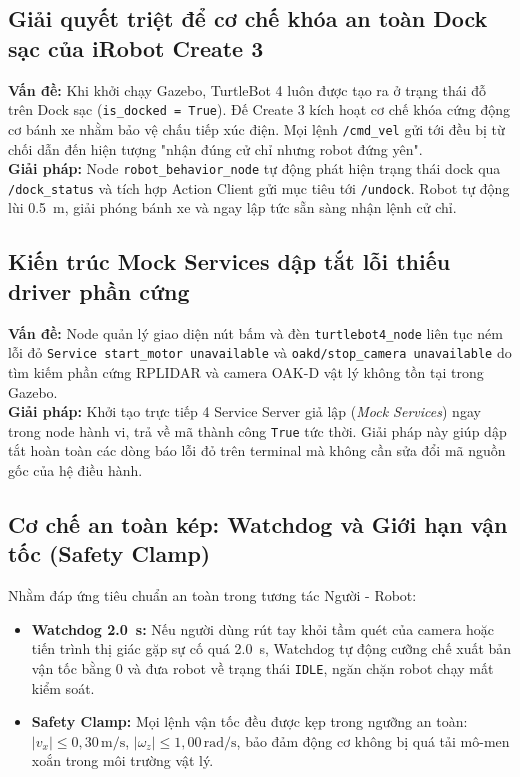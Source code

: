 \subsection{Giải quyết triệt để cơ chế khóa an toàn Dock sạc của iRobot Create 3}
\textbf{Vấn đề:} Khi khởi chạy Gazebo, TurtleBot 4 luôn được tạo ra ở trạng thái đỗ trên Dock sạc (\texttt{is\_docked = True}). Đế Create 3 kích hoạt cơ chế khóa cứng động cơ bánh xe nhằm bảo vệ chấu tiếp xúc điện. Mọi lệnh \texttt{/cmd_vel} gửi tới đều bị từ chối dẫn đến hiện tượng "nhận đúng cử chỉ nhưng robot đứng yên".\\
\textbf{Giải pháp:} Node \texttt{robot\_behavior\_node} tự động phát hiện trạng thái dock qua \texttt{/dock_status} và tích hợp Action Client gửi mục tiêu tới \texttt{/undock}. Robot tự động lùi \SI{0.5}{\meter}, giải phóng bánh xe và ngay lập tức sẵn sàng nhận lệnh cử chỉ.

\subsection{Kiến trúc Mock Services dập tắt lỗi thiếu driver phần cứng}
\textbf{Vấn đề:} Node quản lý giao diện nút bấm và đèn \texttt{turtlebot4\_node} liên tục ném lỗi đỏ \texttt{Service start\_motor unavailable} và \texttt{oakd/stop\_camera unavailable} do tìm kiếm phần cứng RPLIDAR và camera OAK-D vật lý không tồn tại trong Gazebo.\\
\textbf{Giải pháp:} Khởi tạo trực tiếp 4 Service Server giả lập (\textit{Mock Services}) ngay trong node hành vi, trả về mã thành công \texttt{True} tức thời. Giải pháp này giúp dập tắt hoàn toàn các dòng báo lỗi đỏ trên terminal mà không cần sửa đổi mã nguồn gốc của hệ điều hành.

\subsection{Cơ chế an toàn kép: Watchdog và Giới hạn vận tốc (Safety Clamp)}
Nhằm đáp ứng tiêu chuẩn an toàn trong tương tác Người - Robot:
\begin{itemize}
    \item \textbf{Watchdog \SI{2.0}{\second}:} Nếu người dùng rút tay khỏi tầm quét của camera hoặc tiến trình thị giác gặp sự cố quá \SI{2.0}{\second}, Watchdog tự động cưỡng chế xuất bản vận tốc bằng 0 và đưa robot về trạng thái \texttt{IDLE}, ngăn chặn robot chạy mất kiểm soát.
    \item \textbf{Safety Clamp:} Mọi lệnh vận tốc đều được kẹp trong ngưỡng an toàn: $|v_x| \le 0{,}30\,\text{m/s}$, $|\omega_z| \le 1{,}00\,\text{rad/s}$, bảo đảm động cơ không bị quá tải mô-men xoắn trong môi trường vật lý.
\end{itemize}

